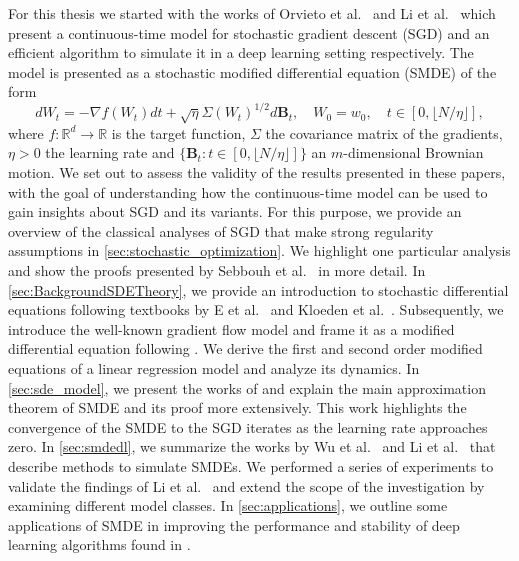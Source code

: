 \documentclass[12pt]{article}
\theoremstyle{definition}
\numberwithin{equation}{section}
\newcommand{\R}{\mathbb{R}}
\begin{document}
For this thesis we started with the works of Orvieto et al.\ \cite{orvietoContinuoustimeModelsStochastic2019a} and Li et al.\ \cite{liValidityModelingSGD2021} which present a continuous-time model for stochastic gradient descent (SGD) and an efficient algorithm to simulate it in a deep learning setting respectively. The model is presented as a stochastic modified differential equation (SMDE) of the form
\begin{equation*}
  d W_t = -\nabla f(W_t) dt + \sqrt{\eta}\Sigma(W_t)^{1/2}d\mathbf{B}_t, \quad W_0 = w_0,\quad t \in [0, \lfloor N / \eta \rfloor],
\end{equation*}
where $f: \R^d \rightarrow \R$ is the target function, $\Sigma$ the covariance matrix of the gradients, $\eta > 0$ the learning rate and $\{ \mathbf{B}_t: t \in [0,\lfloor N / \eta \rfloor]\}$ an $m$-dimensional Brownian motion.
We set out to assess the validity of the results presented in these papers, with the goal of understanding how the continuous-time model can be used to gain insights about SGD and its variants.
For this purpose, we provide an overview of the classical analyses of SGD that make strong regularity assumptions in \autoref{sec:stochastic_optimization}. We highlight one particular analysis and show the proofs presented by Sebbouh et al.\ \cite{sebbouhAlmostSureConvergence2021} in more detail.
In \autoref{sec:BackgroundSDETheory}, we provide an introduction to stochastic differential equations following textbooks by E et al.\ \cite{eAppliedStochasticAnalysis2021} and Kloeden et al.\ \cite{kloedenNumericalSolutionStochastic2013}. Subsequently, we introduce the well-known gradient flow model and frame it as a modified differential equation following \cite{smithOriginImplicitRegularization2021}. We derive the first and second order modified equations of a linear regression model and analyze its dynamics.
In \autoref{sec:sde_model}, we present the works of \cite{liStochasticModifiedEquations2019} and explain the main approximation theorem of SMDE and its proof more extensively. This work highlights the convergence of the SMDE to the SGD iterates as the learning rate approaches zero.
In \autoref{sec:smdedl}, we summarize the works by Wu et al.\ \cite{wuNoisyGradientDescent2020a} and Li et al.\ \cite{liValidityModelingSGD2021} that describe methods to simulate SMDEs. We performed a series of experiments to validate the findings of Li et al.\ \cite{liValidityModelingSGD2021} and extend the scope of the investigation by examining different model classes.  
In \autoref{sec:applications}, we outline some applications of SMDE in improving the performance and stability of deep learning algorithms found in \cite{fontaineConvergenceRatesApproximation2021, zhouTheoreticallyUnderstandingWhy2020, liValidityModelingSGD2021}.
\end{document}
